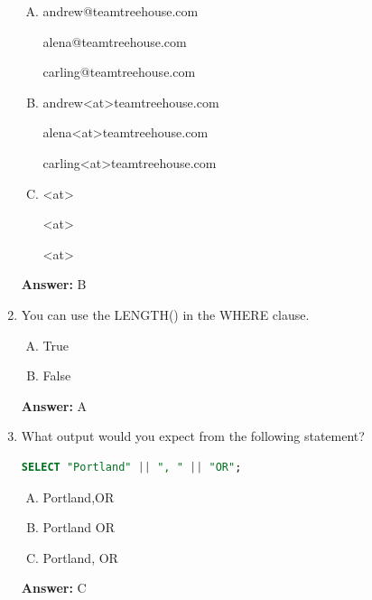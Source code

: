 \documentclass[12pt]{article}
\begin{document}
\begin{enumerate}[1.]
    \bigskip

    \begin{enumerate}[A.]
        \item
        andrew@teamtreehouse.com

        alena@teamtreehouse.com

        carling@teamtreehouse.com

        \item
        andrew<at>teamtreehouse.com

        alena<at>teamtreehouse.com

        carling<at>teamtreehouse.com

        \item
        <at>

        <at>

        <at>

    \end{enumerate}

    \bigskip

    \textbf{Answer:} B


    \item

    You can use the LENGTH() in the WHERE clause.

    \bigskip

    \begin{enumerate}[A.]
        \item True
        \item False
    \end{enumerate}

    \bigskip

    \textbf{Answer:} A

    \item

    What output would you expect from the following statement?

    \bigskip

    \begin{lstlisting}[language=SQL]
    SELECT "Portland" || ", " || "OR";
    \end{lstlisting}


    \begin{enumerate}[A.]
        \item Portland,OR
        \item Portland OR
        \item Portland, OR
    \end{enumerate}

    \bigskip

    \textbf{Answer:} C

\end{enumerate}
\end{document}
